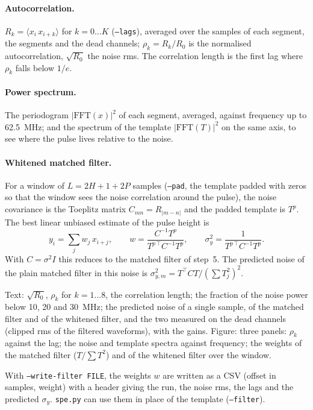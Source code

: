 \documentclass[11pt]{article}
\newcommand{\code}[1]{\texttt{#1}}
\begin{document}
\paragraph{Autocorrelation.} $R_k = \langle x_i\, x_{i+k} \rangle$ for
$k = 0 \dots K$ (\code{--lags}), averaged over the samples of each
segment, the segments and the dead channels; $\rho_k = R_k / R_0$ is the
normalised autocorrelation, $\sqrt{R_0}$ the noise rms. The correlation
length is the first lag where $\rho_k$ falls below $1/e$.

\paragraph{Power spectrum.} The periodogram $|\mathrm{FFT}(x)|^2$ of each
segment, averaged, against frequency up to 62.5~MHz; and the spectrum
of the template $|\mathrm{FFT}(T)|^2$ on the same axis, to see where the
pulse lives relative to the noise.

\paragraph{Whitened matched filter.} For a window of $L = 2H + 1 + 2P$
samples (\code{--pad}, the template padded with zeros so that the window
sees the noise correlation around the pulse), the noise covariance is
the Toeplitz matrix $C_{mn} = R_{|m - n|}$ and the padded template is
$T^p$. The best linear unbiased estimate of the pulse height is
\[
  y_i = \sum_j w_j\, x_{i+j}, \qquad
  w = \frac{C^{-1} T^p}{T^{p\,\top} C^{-1} T^p}, \qquad
  \sigma_y^2 = \frac{1}{T^{p\,\top} C^{-1} T^p}.
\]
With $C = \sigma^2 I$ this reduces to the matched filter of step~5. The
predicted noise of the plain matched filter in this noise is
$\sigma_{y,m}^2 = T^\top C T / (\sum T_j^2)^2$.

Text: $\sqrt{R_0}$, $\rho_k$ for $k = 1 \dots 8$, the correlation length;
the fraction of the noise power below 10, 20 and 30~MHz; the predicted
noise of a single sample, of the matched filter and of the whitened
filter, and the two measured on the dead channels (clipped rms of the
filtered waveforms), with the gains. Figure: three panels: $\rho_k$
against the lag; the noise and template spectra against frequency; the
weights of the matched filter ($T / \sum T^2$) and of the whitened
filter over the window.

With \code{--write-filter FILE}, the weights $w$ are written as a CSV
(offset in samples, weight) with a header giving the run, the noise rms,
the lags and the predicted $\sigma_y$. \code{spe.py} can use them in
place of the template (\code{--filter}).
\end{document}
